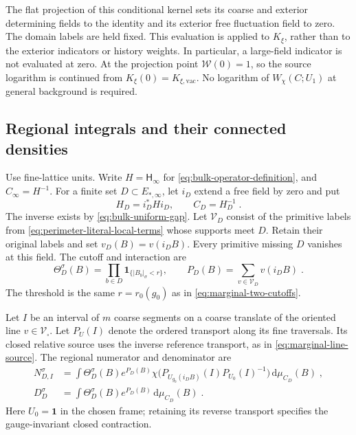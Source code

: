 \documentclass[11pt]{article}
\newcommand{\dd}{\mathrm{d}}
\newcommand{\id}{\mathbf 1}
\begin{document}
The flat projection of this conditional kernel sets its coarse and exterior determining fields to the identity and its exterior free fluctuation field to zero. The domain labels are held fixed. This evaluation is applied to $K_\xi$, rather than to the exterior indicators or history weights. In particular, a large-field indicator is not evaluated at zero. At the projection point $\mathcal W(0)=1$, so the source logarithm is continued from $K_\xi(0)=K_{\xi,\mathrm{vac}}$. No logarithm of $W_\chi(C;U_1)$ at general background is required.

\subsection{Regional integrals and their connected densities}

Use fine-lattice units. Write $H=\mathsf H_\infty$ for \eqref{eq:bulk-operator-definition}, and $C_\infty=H^{-1}$. For a finite set $D\subset E_{*,\infty}$, let $i_D$ extend a free field by zero and put
\begin{equation}\label{eq:regional-precision}
    H_D=i_D^*Hi_D,
    \qquad C_D=H_D^{-1}\;.
\end{equation}
The inverse exists by \eqref{eq:bulk-uniform-gap}. Let $\mathcal V_D$ consist of the primitive labels from \eqref{eq:perimeter-literal-local-terms} whose supports meet $D$. Retain their original labels and set $v_D(B)=v(i_DB)$. Every primitive missing $D$ vanishes at this field. The cutoff and interaction are
\begin{equation}\label{eq:regional-weight}
    \Theta_D^\sigma(B)=\prod_{b\in D}\mathbf1_{\{|B_b|_\sigma<r\}},
    \qquad P_D(B)=\sum_{v\in\mathcal V_D}v(i_DB)\;.
\end{equation}
The threshold is the same $r=r_0(g_0)$ as in \eqref{eq:marginal-two-cutoffs}.

Let $I$ be an interval of $m$ coarse segments on a coarse translate of the oriented line $v\in\mathscr V_\square$. Let $P_U(I)$ denote the ordered transport along its fine traversals. Its closed relative source uses the inverse reference transport, as in \eqref{eq:marginal-line-source}. The regional numerator and denominator are
\begin{equation}\label{eq:regional-integrals}
    \begin{aligned}
        N_{D,I}^\sigma
            &=\int\Theta_D^\sigma(B)e^{P_D(B)}
                \chi\bigl(P_{U_{g_0}(i_DB)}(I)P_{U_0}(I)^{-1}\bigr)
                    \,\dd\mu_{C_D}(B)\;,\\
        D_D^\sigma
            &=\int\Theta_D^\sigma(B)e^{P_D(B)}
                    \,\dd\mu_{C_D}(B)\;.
    \end{aligned}
\end{equation}
Here $U_0=\id$ in the chosen frame; retaining its reverse transport specifies the gauge-invariant closed contraction.
\end{document}
